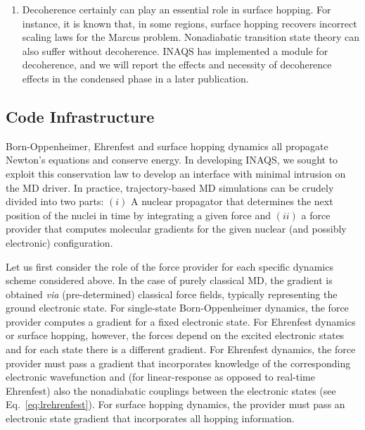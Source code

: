 \documentclass[journal=jctcce,manuscript=article,layout=traditional]{achemso}
\newcommand{\refeq}[1]{Eq.~\ref{#1}}
\begin{document}
\begin{enumerate}
  \item Decoherence certainly can play an essential role in surface hopping.  For instance, it is known that, in some regions, surface hopping recovers incorrect scaling laws for the Marcus problem\cite{landry:2011:marcus_fssh,reichman:2016:fssh}. Nonadiabatic transition state theory can also suffer without decoherence\cite{jain:2015:jpcl}.  INAQS has implemented a module for decoherence, and we will report the effects and necessity of decoherence effects in the condensed phase in a later publication.
\end{enumerate}

\subsection{Code Infrastructure}



%
Born-Oppenheimer, Ehrenfest and surface hopping dynamics all  propagate Newton's equations and conserve energy.
In developing INAQS, we sought to exploit this conservation law to develop an interface with minimal intrusion on the MD driver.
In practice, trajectory-based MD simulations can be crudely divided into two parts:
$(i)$ A nuclear propagator that determines the next position of the nuclei in time by integrating a given force and $(ii)$ a force provider that computes molecular gradients for the given nuclear (and possibly electronic) configuration.

Let us first consider the role of the force provider for each specific dynamics scheme considered above.
In the case of purely classical MD, the gradient is obtained \emph{via} (pre-determined) classical force fields, typically representing the ground electronic state.
For single-state Born-Oppenheimer dynamics, the force provider computes a gradient for a fixed electronic state.
For Ehrenfest dynamics or surface hopping, however,  the forces depend on the excited electronic states and for each state there is a different gradient. For Ehrenfest dynamics, the force provider must pass a gradient that incorporates knowledge of the corresponding electronic wavefunction and (for linear-response as opposed to real-time Ehrenfest) also the nonadiabatic couplings between the electronic states (see \refeq{eq:lrehrenfest}).  For surface hopping dynamics, the provider must pass an electronic state gradient that incorporates all hopping information.
\end{document}

